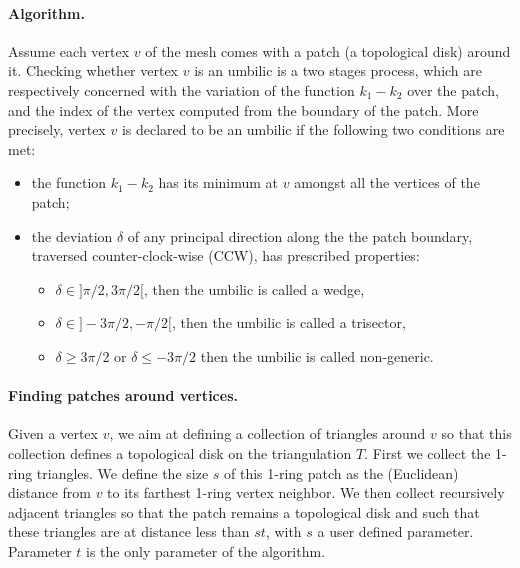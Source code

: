 %

\paragraph{Algorithm.}
Assume each vertex $v$ of the mesh comes with a patch (a topological
disk) around it. Checking whether vertex $v$ is an umbilic is a two
stages process, which are respectively concerned with the variation
of the function $k_1-k_2$ over the patch, and the index of the vertex
computed from the boundary of the patch. More precisely, vertex $v$ is
declared to be an umbilic if the following two conditions are met:
\begin{itemize}
\item
the function $k_1-k_2$ has its minimum at $v$ amongst all the
vertices of the patch;
\item
the deviation $\delta$ of any principal direction along the the patch
boundary, traversed counter-clock-wise (CCW), has prescribed
properties:
\begin{itemize}
\item
$\delta \in ]\pi/2,3\pi/2[$, then the umbilic is called a wedge,
\item
$\delta \in ]-3\pi/2,-\pi/2[$, then the umbilic is called a trisector,
\item
$\delta \geq 3\pi/2$ or $\delta \leq -3\pi/2$ then the umbilic is called non-generic.
\end{itemize}
\end{itemize}


\paragraph{Finding patches around vertices.}
Given a vertex $v$, we aim at defining a collection of triangles
around $v$ so that this collection defines a topological disk on the
triangulation $T$. First we collect the 1-ring triangles. We define
the size $s$ of this 1-ring patch as the (Euclidean) distance from $v$
to its farthest 1-ring vertex neighbor. We then collect recursively
adjacent triangles so that the patch remains a topological disk and
such that these triangles are at distance less than $st$, with $s$ a
user defined parameter. Parameter $t$ is the only parameter of the
algorithm.

